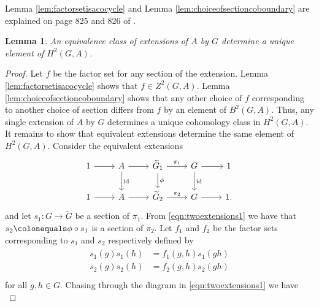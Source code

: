 \documentclass{dcthesis}
\newcommand{\mm}[1]{{\color{blue} \sf MM: [#1]}}
\newcommand{\wt}[1]{\widetilde{#1}}
\DeclareMathOperator{\id}{id}
\numberwithin{equation}{section}
\newtheorem{lemma}[equation]{Lemma}
\theoremstyle{definition}
\theoremstyle{remark}
\begin{document}
{{{    Lemma \ref{lem:factorsetisacocycle}
    and Lemma
    \ref{lem:choiceofsectioncoboundary}
    are explained on page 825 and 826 of
    \cite{DF}.
    \begin{lemma}
      \label{lem:equivalentextensionssamecohomologyclass}
      An equivalence class of extensions of $A$ by $G$
      determine a unique element of
      $H^2(G,A)$.
    \end{lemma}
    \begin{proof}
      Let $f$ be the factor set for
      any section of the extension.
      Lemma \ref{lem:factorsetisacocycle} shows
      that $f\in Z^2(G,A)$.
      Lemma \ref{lem:choiceofsectioncoboundary}
      shows that any other choice of $f$
      corresponding to another choice of section
      differs from $f$ by an element of
      $B^2(G,A)$.
      Thus,
      any single extension of $A$ by $G$
      determines a unique cohomology class
      in $H^2(G,A)$.
      It remains to show that equivalent extensions
      determine the same element of $H^2(G,A)$.
      Consider the
      equivalent extensions
      \begin{equation}
        \label{eqn:twoextensions1}
        \begin{tikzcd}
          1\arrow{r}&A\arrow{d}{\id}\arrow{r}{}&\wt{G}_1\arrow{r}{\pi_1}\arrow{d}{\phi}&G\arrow{d}{\id}\arrow{r}{}&1\\
          1\arrow{r}&A\arrow{r}{}&\wt{G}_2\arrow{r}{\pi_2}&G\arrow{r}{}&1.
        \end{tikzcd}
      \end{equation}
      and let
      $s_1\colon G\to\wt{G}$
      be a section of $\pi_1$.
      From \eqref{eqn:twoextensions1} we have that
      $s_2\colonequals \phi\circ s_1$ is a
      section of $\pi_2$.
      Let $f_1$ and $f_2$ be the factor sets
      corresponding to $s_1$
      and $s_2$ respectively
      defined by
      \begin{align}
        \label{eqn:twofactorsets}
        \begin{split}
          s_1(g)s_1(h) &= f_1(g,h)s_1(gh)\\
          s_2(g)s_2(h) &= f_2(g,h)s_2(gh)\\
        \end{split}
      \end{align}
      for all $g,h\in G$.
      Chasing through the diagram in
      \eqref{eqn:twoextensions1}
      we have
      \begin{equation}

\end{equation}
\end{proof}}}}
\end{document}
